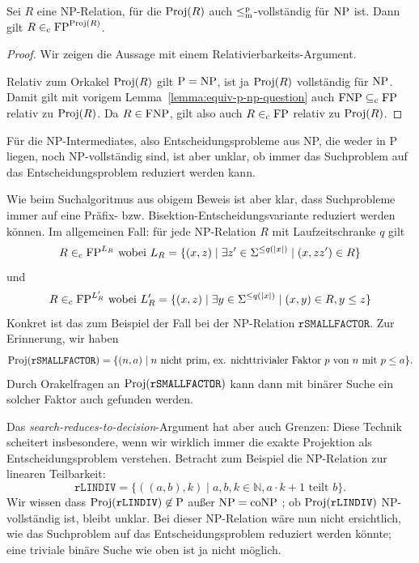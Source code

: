 \begin{corollary}\label{corr:search-to-decision}
    Sei $R$ eine NP-Relation, für die $\operatorname{Proj}(R)$ auch $\leq_\mathrm{m}^\mathrm{p}$-vollständig für $\mathrm{NP}$ ist.
    Dann gilt $R\in_\mathrm{c} \mathrm{FP}^{\operatorname{Proj}(R)}$.
\end{corollary}
\begin{proof}
    Wir zeigen die Aussage mit einem Relativierbarkeits-Argument.

    Relativ zum Orkakel $\operatorname{Proj}(R)$ gilt $\mathrm{P}=\mathrm{NP}$, ist ja $\operatorname{Proj}(R)$ vollständig für $\mathrm{NP}$. Damit gilt mit vorigem Lemma~\ref{lemma:equiv-p-np-question} auch $\mathrm{FNP} \subseteq_\mathrm{c} \mathrm{FP}$ relativ zu $\operatorname{Proj}(R)$.
    Da $R\in \mathrm{FNP}$, gilt also auch $R\in_\mathrm{c} \mathrm{FP}$ relativ zu $\operatorname{Proj}(R)$.
\end{proof}

Für die NP-Intermediates, also Entscheidungsprobleme aus NP, die weder in P liegen, noch NP-vollständig sind, ist aber unklar, ob immer das Suchproblem auf das Entscheidungsproblem reduziert werden kann.

Wie beim Suchalgoritmus aus obigem Beweis ist aber klar, dass Suchprobleme immer auf eine Präfix- bzw. Bisektion-Entscheidungsvariante reduziert werden können.
Im allgemeinen Fall: für jede NP-Relation $R$ mit Laufzeitschranke $q$ gilt
\[ R \in_\mathrm{c} \mathrm{FP}^{L_R} \text{ wobei } L_R = \{ (x, z) \mid \exists z'\in\Sigma^{\leq q(|x|)} \mid (x, zz')\in R \} \]
und 
\[ R \in_\mathrm{c} \mathrm{FP}^{L'_R} \text{ wobei } L'_R = \{ (x, z) \mid \exists y\in\Sigma^{\leq q(|x|)} \mid (x, y) \in R, y\leq z \} \]
Konkret ist das zum Beispiel der Fall bei der NP-Relation $\mathtt{rSMALLFACTOR}$. Zur Erinnerung, wir haben
\[ \operatorname{Proj}(\mathtt{rSMALLFACTOR}) = \{ (n,a)\mid \text{$n$ nicht prim, ex. nichttrivialer Faktor $p$ von $n$ mit $p\leq a$} \}. \]
Durch Orakelfragen an $\operatorname{Proj}(\mathtt{rSMALLFACTOR})$ kann dann mit binärer Suche ein solcher Faktor auch gefunden werden.

Das \emph{search-reduces-to-decision}-Argument hat aber auch Grenzen:
Diese Technik scheitert insbesondere, wenn wir wirklich immer die exakte Projektion als Entscheidungsproblem verstehen. Betracht zum Beispiel die NP-Relation zur linearen Teilbarkeit:
\[ \mathtt{rLINDIV} = \{ ((a, b), k) \mid a,b,k\in\mathbb N, a\cdot k + 1\text{ teilt } b\}. \]
Wir wissen dass $\operatorname{Proj}(\mathtt{rLINDIV})\not\in \mathrm{P}$ außer $\mathrm{NP}=\mathrm{coNP}$ \parencite{adleman_reducibility_1977}; ob $\operatorname{Proj}(\mathtt{rLINDIV})$ NP-vollständig ist, bleibt unklar.
Bei dieser NP-Relation wäre nun nicht ersichtlich, wie das Suchproblem auf das Entscheidungsproblem reduziert werden könnte; eine triviale binäre Suche wie oben ist ja nicht möglich.

